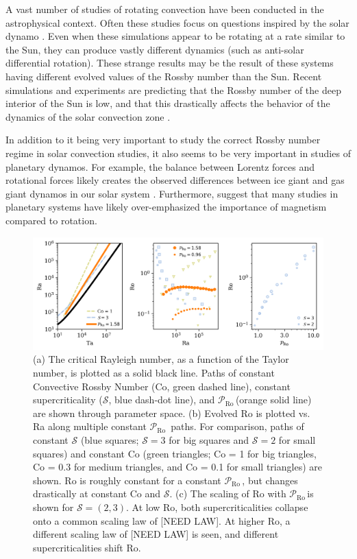 \documentclass[twocolumn, amsmath, amsfonts, amssymb]{aastex62}
\newcommand{\pro}{\ensuremath{\mathcal{P}_{\text{Ro}}\,}}
\begin{document}
A vast number of studies of rotating convection have been conducted in the astrophysical context.
Often these studies focus on questions inspired by the solar dynamo
\citep{glatzmaier&gilman1982, busse2002, brown&all2008,
brown&all2010, brown&all2011, augustson&all2012, guerrero&all2013, kapyla&all2014}.
Even when these simulations appear to be rotating at a rate similar to the Sun,
they can produce vastly different dynamics (such as anti-solar differential rotation).
These strange results may be the result of these systems having different evolved
values of the Rossby number than the Sun. Recent simulations and experiments are predicting
that the Rossby number of the deep interior of the Sun is low, and that this drastically
affects the behavior of the dynamics of the solar convection zone
\citep{featherstone&hindman2016, greer&all2016}.

In addition to it being very important to study the correct Rossby number
regime in solar convection studies, it also seems to be very important in
studies of planetary dynamos. For example, the balance between Lorentz forces
and rotational forces likely creates the observed differences between ice
giant and gas giant dynamos in our solar system \citep{soderlund&all2015}.
Furthermore, \cite{aurnou&king2017} suggest that many studies in planetary systems
have likely over-emphasized the importance of magnetism compared to rotation.

\begin{figure}[t!]
\includegraphics[width=\textwidth]{parameter_space.png}
\caption{(a) The critical Rayleigh number, as a function of the Taylor number, 
is plotted as a solid black line. Paths of constant Convective Rossby Number
(Co, green dashed line), constant supercriticality ($\mathcal{S}$, blue dash-dot line), and 
\pro (orange solid line) are shown through parameter space. (b) Evolved
Ro is plotted vs. Ra along multiple constant \pro
paths. For comparison, paths of constant $\mathcal{S}$ (blue squares; $\mathcal{S} = 3$ for
big squares and $\mathcal{S} = 2$ for small squares)
and constant Co (green triangles; Co = 1 for big triangles, Co = 0.3 for medium triangles,
and Co = 0.1 for small triangles) are shown.
Ro is roughly constant for a constant \pro, but changes drastically at constant Co and 
$\mathcal{S}$.
(c) The scaling of Ro with \pro is shown for $\mathcal{S} = (2,3)$.
At low Ro, both supercriticalities collapse onto a common scaling law of [NEED LAW].
At higher Ro, a different scaling law of [NEED LAW] is seen, and different supercriticalities
shift Ro.
\label{fig:parameter_space} }
\end{figure}
\end{document}
